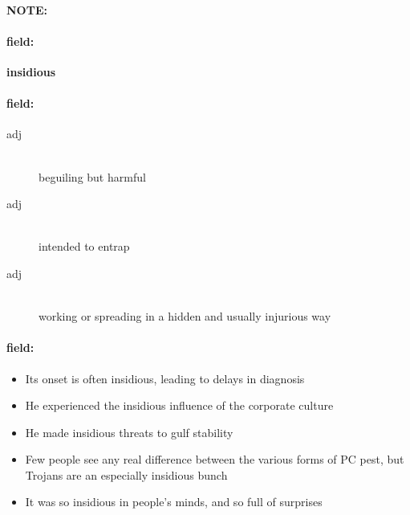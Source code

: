 \documentclass[12pt]{article}
\newenvironment{note}{\paragraph{NOTE:}}{}
\newenvironment{field}{\paragraph{field:}}{}
\begin{document}
\begin{note}
\begin{field}
\textbf{\large insidious}
\end{field}


\begin{field}
\begin{description}
\item[adj] \hfill \\ 
beguiling but harmful

\item[adj] \hfill \\ 
intended to entrap

\item[adj] \hfill \\ 
working or spreading in a hidden and usually injurious way

\end{description}
\end{field}

\begin{field}
\begin{itemize}
\item Its onset is often insidious, leading to delays in diagnosis
\item He experienced the insidious influence of the corporate culture
\item He made insidious threats to gulf stability
\item Few people see any real difference between the various forms of PC pest, but Trojans are an especially insidious bunch
\item It was so insidious in people's minds, and so full of surprises
\end{itemize}
\end{field}
\end{note}
\end{document}
